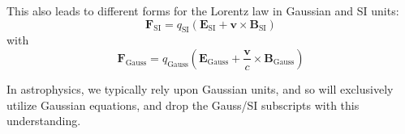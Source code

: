 \documentclass[notoc]{tufte-handout}
\renewcommand{\vec}[1]{
\mathbf{#1}
}
\begin{document}
This also leads to different forms for the Lorentz law in Gaussian and SI units:
\begin{equation}
    \vec{F}_{\text{SI}} = q_{\text{SI}} \left( \vec{E}_{\text{SI}} + \vec{v}\times \vec{B}_{\text{SI}} \right)
\end{equation}
with 
\begin{equation}
\vec{F}_{\text{Gauss}} = q_{\text{Gauss}} \left( \vec{E}_{\text{Gauss}} + \frac{\vec{v}}{c} \times \vec{B}_{\text{Gauss}} \right)
\end{equation}


In astrophysics, we typically rely upon Gaussian units, and so will exclusively utilize Gaussian equations, and drop the Gauss/SI subscripts with this understanding. 
\end{document}
